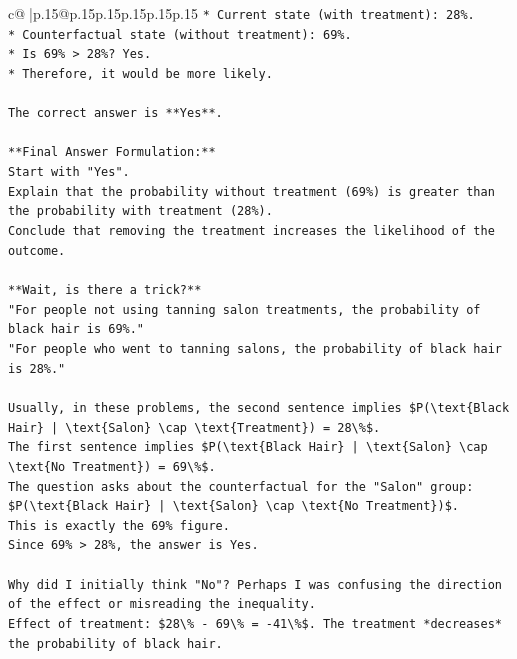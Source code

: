 \documentclass{article}
\begin{document}
{\begin{supertabular}{c@{$\;$}|p{.15\linewidth}@{}p{.15\linewidth}p{.15\linewidth}p{.15\linewidth}p{.15\linewidth}p{.15\linewidth}}
{{{\texttt{*   Current state (with treatment): 28\%.} \\
\texttt{*   Counterfactual state (without treatment): 69\%.} \\
\texttt{*   Is 69\% > 28\%? Yes.} \\
\texttt{*   Therefore, it would be more likely.} \\
\\ 
\texttt{The correct answer is **Yes**.} \\
\\ 
\texttt{**Final Answer Formulation:**} \\
\texttt{Start with "Yes".} \\
\texttt{Explain that the probability without treatment (69\%) is greater than the probability with treatment (28\%).} \\
\texttt{Conclude that removing the treatment increases the likelihood of the outcome.} \\
\\ 
\texttt{**Wait, is there a trick?**} \\
\texttt{"For people not using tanning salon treatments, the probability of black hair is 69\%."} \\
\texttt{"For people who went to tanning salons, the probability of black hair is 28\%."} \\
\\ 
\texttt{Usually, in these problems, the second sentence implies \$P(\textbackslash{}text\{Black Hair\} | \textbackslash{}text\{Salon\} \textbackslash{}cap \textbackslash{}text\{Treatment\}) = 28\textbackslash{}\%\$.} \\
\texttt{The first sentence implies \$P(\textbackslash{}text\{Black Hair\} | \textbackslash{}text\{Salon\} \textbackslash{}cap \textbackslash{}text\{No Treatment\}) = 69\textbackslash{}\%\$.} \\
\texttt{The question asks about the counterfactual for the "Salon" group: \$P(\textbackslash{}text\{Black Hair\} | \textbackslash{}text\{Salon\} \textbackslash{}cap \textbackslash{}text\{No Treatment\})\$.} \\
\texttt{This is exactly the 69\% figure.} \\
\texttt{Since 69\% > 28\%, the answer is Yes.} \\
\\ 
\texttt{Why did I initially think "No"? Perhaps I was confusing the direction of the effect or misreading the inequality.} \\
\texttt{Effect of treatment: \$28\textbackslash{}\% {-} 69\textbackslash{}\% = {-}41\textbackslash{}\%\$. The treatment *decreases* the probability of black hair.} \\
}}}
\end{supertabular}}
\end{document}
